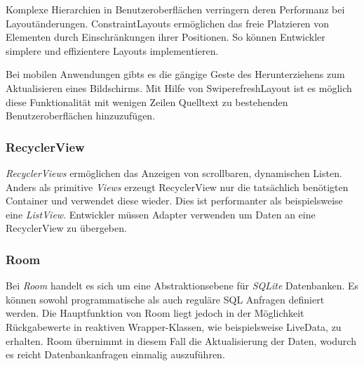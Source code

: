 \documentclass[a4paper, 11pt]{article}
\begin{document}
Komplexe Hierarchien in Benutzeroberflächen verringern deren Performanz bei Layoutänderungen.
ConstraintLayouts ermöglichen das freie Platzieren von Elementen durch Einschränkungen ihrer Positionen.
So können Entwickler simplere und effizientere Layouts implementieren.

Bei mobilen Anwendungen gibts es die gängige Geste des Herunterziehens zum Aktualisieren eines Bildschirms.
Mit Hilfe von SwiperefreshLayout ist es möglich diese Funktionalität mit wenigen Zeilen Quelltext zu bestehenden Benutzeroberflächen hinzuzufügen.

\subsubsection{RecyclerView}
\label{subsubsec:app:jetpack:recyclerview}
\textit{RecyclerViews} ermöglichen das Anzeigen von scrollbaren, dynamischen Listen.
Anders als primitive \textit{Views} erzeugt RecyclerView nur die tatsächlich benötigten Container und verwendet diese wieder.
Dies ist performanter als beispielsweise eine \textit{ListView}.
Entwickler müssen Adapter verwenden um Daten an eine RecyclerView zu übergeben.

\subsubsection{Room}
\label{subsubsec:app:jetpack:room}
Bei \textit{Room} handelt es sich um eine Abstraktionsebene für \textit{SQLite} Datenbanken.
Es können sowohl programmatische als auch reguläre SQL Anfragen definiert werden.
Die Hauptfunktion von Room liegt jedoch in der Möglichkeit Rückgabewerte in reaktiven Wrapper-Klassen, wie beispielsweise LiveData, zu erhalten.
Room übernimmt in diesem Fall die Aktualisierung der Daten, wodurch es reicht Datenbankanfragen einmalig auszuführen.
\end{document}
